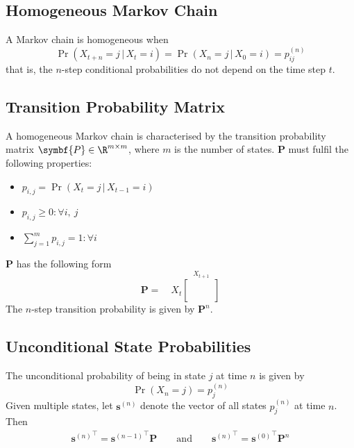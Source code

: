 \documentclass{article}
\begin{document}
\subsection{Homogeneous Markov Chain}
A Markov chain is homogeneous when
\begin{equation*}
    \Pr{\left( X_{t+n} = j \,\vert\, X_t = i \right)} = \Pr{\left( X_n = j \,\vert\, X_0 = i \right)} = p_{i j}^{\left( n \right)}
\end{equation*}
that is, the \(n\)-step conditional probabilities do not depend on the time step \(t\).
\subsection{Transition Probability Matrix}
A homogeneous Markov chain is characterised by the transition
probability matrix \(\symbf{P} \in \R^{m \times m}\), where \(m\) is
the number of states. \(\symbf{P}\) must fulfil the following
properties:
\begin{itemize}
    \item \(p_{i,j} = \Pr{\left( X_t = j \,\vert\, X_{t-1} = i \right)}\)
    \item \(p_{i,j} \geq 0 : \forall i,\: j\)
    \item \(\sum_{j=1}^m p_{i,j} = 1 : \forall i\)
\end{itemize}
\(\symbf{P}\) has the following form
\begin{equation*}
    \symbf{P} = \quad \scriptscriptstyle{X_t} \overset{X_{t+1}}{
        \begin{bmatrix}
            \phantom{p} & \phantom{p} \\
            \phantom{p} & \phantom{p}
        \end{bmatrix}
    }
\end{equation*}
The \(n\)-step transition probability is given by \(\symbf{P}^n\).
\subsection{Unconditional State Probabilities}
The unconditional probability of being in state \(j\) at time \(n\) is
given by
\begin{equation*}
    \Pr{\left( X_n = j \right)} = p_j^{\left( n \right)}
\end{equation*}
Given multiple states, let \(\symbf{s}^{\left( n \right)}\) denote the vector of all states \(p_j^{\left( n \right)}\) at
time \(n\). Then
\begin{align*}{\symbf{s}^{\left( n \right)}}^\top = {\symbf{s}^{\left( n-1 \right)}}^\top \symbf{P} \quad \quad \text{and} \quad \quad {\symbf{s}^{\left( n \right)}}^\top = {\symbf{s}^{\left( 0 \right)}}^\top \symbf{P}^n
\end{align*}
\end{document}

